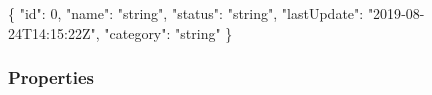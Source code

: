 \documentclass[
]{article}
\newenvironment{Shaded}{}{}
\newcommand{\DataTypeTok}[1]{\textcolor[rgb]{0.56,0.13,0.00}{#1}}
\newcommand{\DecValTok}[1]{\textcolor[rgb]{0.25,0.63,0.44}{#1}}
\newcommand{\FunctionTok}[1]{\textcolor[rgb]{0.02,0.16,0.49}{#1}}
\newcommand{\StringTok}[1]{\textcolor[rgb]{0.25,0.44,0.63}{#1}}
\begin{document}
\begin{Shaded}
\begin{Highlighting}[]
\FunctionTok{\{}
  \DataTypeTok{"id"}\FunctionTok{:} \DecValTok{0}\FunctionTok{,}
  \DataTypeTok{"name"}\FunctionTok{:} \StringTok{"string"}\FunctionTok{,}
  \DataTypeTok{"status"}\FunctionTok{:} \StringTok{"string"}\FunctionTok{,}
  \DataTypeTok{"lastUpdate"}\FunctionTok{:} \StringTok{"2019{-}08{-}24T14:15:22Z"}\FunctionTok{,}
  \DataTypeTok{"category"}\FunctionTok{:} \StringTok{"string"}
\FunctionTok{\}}
\end{Highlighting}
\end{Shaded}

\hypertarget{properties-1}{%
\subsubsection{Properties}\label{properties-1}}
\end{document}
